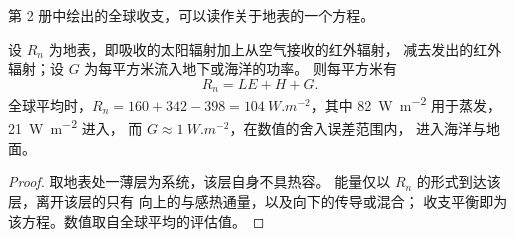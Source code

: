 第 2 册中绘出的全球收支，可以读作关于地表的一个方程。

\begin{proposition}[地表能量平衡]\label{prop:b1:radiation-heat-transport:surface}
设 $R_n$ 为地表，即吸收的太阳辐射加上从空气接收的红外辐射，
减去发出的红外辐射；设 $G$ 为每平方米流入地下或海洋的功率。
则每平方米有
\[
  R_n = LE + H + G .
\]
全球平均时，$R_n = 160 + 342 - 398 = \qty{104}{W.m^{-2}}$，其中
\qty{82}{W.m^{-2}} 用于蒸发，\qty{21}{W.m^{-2}} 进入，
而 $G \approx \qty{1}{W.m^{-2}}$，在数值的舍入误差范围内，
进入海洋与地面。
\end{proposition}

\begin{proof}
取地表处一薄层为系统，该层自身不具热容。
能量仅以 $R_n$ 的形式到达该层，离开该层的只有
向上的与感热通量，以及向下的传导或混合；
收支平衡即为该方程。数值取自全球平均的评估值。
\end{proof}

